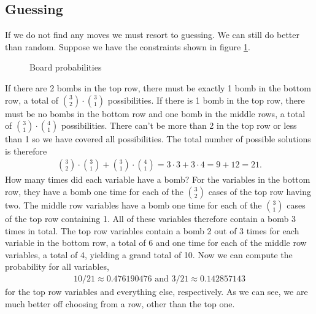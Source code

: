 \documentclass[11pt,a4paper,notitlepage]{article}
\theoremstyle{definition}
\begin{document}
\subsection{Guessing}
If we do not find any moves we must resort to guessing. We can still do better than random. Suppose we have the constraints shown in figure \ref{fig:prob}.
\begin{figure}[H]
\begin{center}
\end{center}
\caption{Board probabilities}
\label{fig:prob}
\end{figure}
If there are 2 bombs in the top row, there must be exactly 1 bomb in the bottom row, a total of $\binom{3}{2} \cdot \binom{3}{1}$ possibilities. If there is 1 bomb in the top row, there must be no bombs in the bottom row and one bomb in the middle rows, a total of $\binom{3}{1} \cdot \binom{4}{1}$ possibilities. There can't be more than 2 in the top row or less than 1 so we have covered all possibilities. The total number of possible solutions is therefore
\begin{align*}
\binom{3}{2} \cdot \binom{3}{1} + \binom{3}{1} \cdot \binom{4}{1} = 3 \cdot 3 + 3 \cdot 4 = 9 + 12  = 21.
\end{align*}
How many times did each variable have a bomb? For the variables in the bottom row, they have a bomb one time for each of the $\binom{3}{2}$ cases of the top row having two. The middle row variables have a bomb one time for each of the $\binom{3}{1}$ cases of the top row containing 1. All of these variables therefore contain a bomb 3 times in total. The top row variables contain a bomb 2 out of 3 times for each variable in the bottom row, a total of 6 and one time for each of the middle row variables, a total of 4, yielding a grand total of 10. Now we can compute the probability for all variables,
\begin{align*}
10 / 21 \approx 0.476190476 \text{ and } 3/21 \approx 0.142857143
\end{align*}
for the top row variables and everything else, respectively. As we can see, we are much better off choosing from a row, other than the top one.\\
\end{document}
